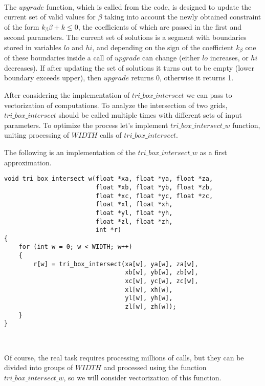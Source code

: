 \documentclass[
11pt,%
tightenlines,%
twoside,%
onecolumn,%
nofloats,%
nobibnotes,%
nofootinbib,%
superscriptaddress,%
noshowpacs,%
centertags]%
{revtex4}
\begin{document}
\ \\
 
The $upgrade$ function, which is called from the code, is designed to update the current set of valid values for $\beta$ taking into account the newly obtained constraint of the form $k_{\beta}\beta + k \le 0$, the coefficients of which are passed in the first and second parameters.
The current set of solutions is a segment with boundaries stored in variables $lo$ and $hi$, and depending on the sign of the coefficient $k_{\beta}$ one of these boundaries inside a call of $upgrade$ can change (either $lo$ increases, or $hi$ decreases).
If after updating the set of solutions it turns out to be empty (lower boundary exceeds upper), then $upgrade$ returns 0, otherwise it returns 1.

After considering the implementation of $tri\_box\_intersect$ we can pass to vectorization of computations.
To analyze the intersection of two grids, $tri\_box\_intersect$ should be called multiple times with different sets of input parameters.
To optimize the process let's implement $tri\_box\_intersect\_w$ function, uniting processing of $WIDTH$ calls of $tri\_box\_intersect$.

The following is an implementation of the $tri\_box\_intersect\_w$ as a first approximation.

\begin{lstlisting}[caption={Original implementation of a function combining $WIDTH$ function calls $tri\_box\_intersect$.},label={lst:prac_intersect_w}]
void tri_box_intersect_w(float *xa, float *ya, float *za,
                         float *xb, float *yb, float *zb,
                         float *xc, float *yc, float *zc,
                         float *xl, float *xh,
                         float *yl, float *yh,
                         float *zl, float *zh,
                         int *r)
{
    for (int w = 0; w < WIDTH; w++)
    {
        r[w] = tri_box_intersect(xa[w], ya[w], za[w],
                                 xb[w], yb[w], zb[w],
                                 xc[w], yc[w], zc[w],
                                 xl[w], xh[w],
                                 yl[w], yh[w],
                                 zl[w], zh[w]);
    }
}
\end{lstlisting}

\

Of course, the real task requires processing millions of calls, but they can be divided into groups of $WIDTH$ and processed using the function $tri\_box\_intersect\_w$, so we will consider vectorization of this function.
\end{document}
